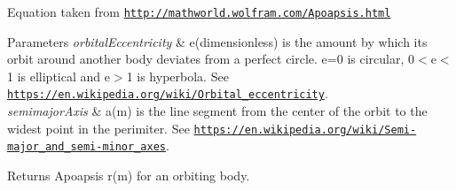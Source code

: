 Equation taken from \href{http://mathworld.wolfram.com/Apoapsis.html}{\tt http\+://mathworld.\+wolfram.\+com/\+Apoapsis.\+html}


\begin{DoxyParams}{Parameters}
{\em orbital\+Eccentricity} & e(dimensionless) is the amount by which its orbit around another body deviates from a perfect circle. e=0 is circular, 0$<$e$<$1 is elliptical and e$>$1 is hyperbola. See \href{https://en.wikipedia.org/wiki/Orbital_eccentricity}{\tt https\+://en.\+wikipedia.\+org/wiki/\+Orbital\+\_\+eccentricity}. \\
\hline
{\em semimajor\+Axis} & a(m) is the line segment from the center of the orbit to the widest point in the perimiter. See \href{https://en.wikipedia.org/wiki/Semi-major_and_semi-minor_axes}{\tt https\+://en.\+wikipedia.\+org/wiki/\+Semi-\/major\+\_\+and\+\_\+semi-\/minor\+\_\+axes}. \\
\hline
\end{DoxyParams}
\begin{DoxyReturn}{Returns}
Apoapsis r(m) for an orbiting body. 
\end{DoxyReturn}
